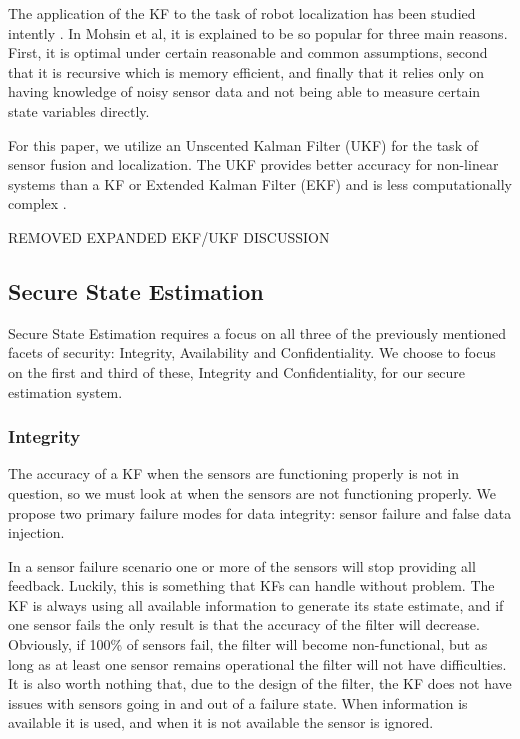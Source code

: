 \documentclass[conference]{IEEEtran}
\begin{document}
The application of the KF to the task of robot localization has been studied intently \cite{Localization2003, Mohsin2014}. In Mohsin et al, it is explained to be so popular for three main reasons\cite{Mohsin2014}. First, it is optimal under certain reasonable and common assumptions, second that it is recursive which is memory efficient, and finally that it relies only on having knowledge of noisy sensor data and not being able to measure certain state variables directly.

For this paper, we utilize an Unscented Kalman Filter (UKF) for the task of sensor fusion and localization. The UKF provides better accuracy for non-linear systems than a KF or Extended Kalman Filter (EKF) and is less computationally complex \cite{Julier1997}.

REMOVED EXPANDED EKF/UKF DISCUSSION

\subsection{Secure State Estimation}
Secure State Estimation requires a focus on all three of the previously mentioned facets of security: Integrity, Availability and Confidentiality. We choose to focus on the first and third of these, Integrity and Confidentiality, for our secure estimation system.

\subsubsection{Integrity}
The accuracy of a KF when the sensors are functioning properly is not in question, so we must look at when the sensors are not functioning properly. We propose two primary failure modes for data integrity: sensor failure and false data injection.

In a sensor failure scenario one or more of the sensors will stop providing all feedback. Luckily, this is something that KFs can handle without problem. The KF is always using all available information to generate its state estimate, and if one sensor fails the only result is that the accuracy of the filter will decrease. Obviously, if 100\% of sensors fail, the filter will become non-functional, but as long as at least one sensor remains operational the filter will not have difficulties. It is also worth nothing that, due to the design of the filter, the KF does not have issues with sensors going in and out of a failure state. When information is available it is used, and when it is not available the sensor is ignored.
\end{document}
